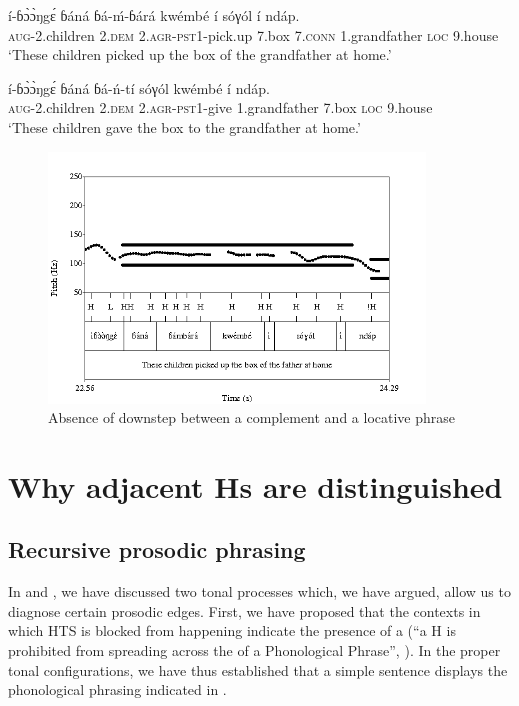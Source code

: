 \documentclass[output=paper,newtxmath,modfonts,nonflat]{langsci/langscibook}
\begin{document}
\ea  \gll í-ɓ\`ɔ\`ɔŋg\'ɛ ɓ{á}n{á} ɓ{á}-\'m-ɓ{á}r{á} kwémbé í sóγól í {\textdownstep}nd{á}p.\\
\textsc{aug}-2.children 2.\textsc{dem} 2.\textsc{agr}-\textsc{pst1}-pick.up 7.box 7.\textsc{conn} 1.grandfather \textsc{loc} 9.house\\
\glt `These children picked up the box of the grandfather at home.'\label{ex:HamlaouiMakasso:15}
\z

\ea \gll í-ɓ\`ɔ\`ɔŋg\'ɛ ɓ{á}n{á} ɓ{á}-ń-tí sóγól {\textdownstep}kwémbé í {\textdownstep}nd{á}p.\\
\textsc{aug}-2.children 2.\textsc{dem} 2.\textsc{agr}-\textsc{pst1}-give 1.grandfather 7.box \textsc{loc} 9.house\\
\glt `These children gave the box to the grandfather at home.'\label{ex:HamlaouiMakasso:16}
\z


\begin{figure}

\caption{Absence of downstep between a complement and a locative phrase  \label{fig:HamlaouiMakasso:6}}
\includegraphics[width=10cm]{figures/LocSept16B}

\end{figure}


\section{Why adjacent Hs are distinguished}\label{sec:HamlaouiMakasso:4} 

\subsection{Recursive prosodic phrasing}

In \citet{HamlaouiEtAl14} and \citet{HamlaouiSzendroi15, HamlaouiSzendroi16}, we have discussed two tonal processes which, we have argued, allow us to diagnose certain prosodic edges. First, we have proposed that the contexts in which HTS is blocked from happening indicate the presence of a   (``a H  is prohibited from spreading across the  of a Phonological Phrase'', \citealt[27]{HamlaouiEtAl14}). In the proper tonal configurations, we have thus established that a simple sentence displays the phonological phrasing indicated in .
\end{document}
